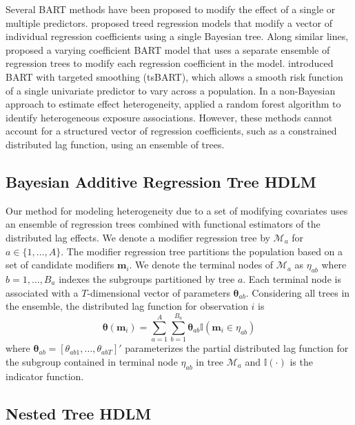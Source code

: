 \documentclass[12pt]{article}
\begin{document}
Several BART methods have been proposed to modify the effect of a single or multiple predictors. \cite{Chipman2002} proposed treed regression models that modify a vector of individual regression coefficients using a single Bayesian tree. Along similar lines, \cite{Deshpande2020VCBART:Coefficients} proposed a varying coefficient BART model that uses a separate ensemble of regression trees to modify each regression coefficient in the model. \cite{Starling2019} introduced BART with targeted smoothing (tsBART), which allows a smooth risk function of a single univariate predictor to vary across a population.  In a non-Bayesian approach to estimate effect heterogeneity, \cite{Odden2020HeterogeneousAdults} applied a random forest algorithm to identify heterogeneous exposure associations. However, these methods cannot account for a structured vector of regression coefficients, such as a constrained distributed lag function, using an ensemble of trees.

\subsection{Bayesian Additive Regression Tree HDLM}\label{sec:bart_hdlm}
Our method for modeling heterogeneity due to a set of modifying covariates uses an ensemble of regression trees combined with functional estimators of the distributed lag effects. We denote a modifier regression tree by $\mathcal{M}_a$ for $a\in\{1,\ldots,A\}$. The modifier regression tree partitions the population based on a set of candidate modifiers $\mathbf{m}_i$. We denote the terminal nodes of $\mathcal{M}_a$ as $\eta_{ab}$ where $b=1,\ldots,B_a$ indexes the subgroups partitioned by tree $a$.  Each terminal node is associated with a $T$-dimensional vector of parameters $\boldsymbol\theta_{ab}$. Considering all trees in the ensemble, the distributed lag function for observation $i$ is
\begin{equation}\label{eq:dlmtree_heterogeneous_dlm}
    \boldsymbol\theta(\mathbf{m}_i)=\sum_{a=1}^A\sum_{b=1}^{B_a}\boldsymbol\theta_{ab}\mathbb{I}(\mathbf{m}_i\in\eta_{ab})
\end{equation}
where $\boldsymbol\theta_{ab}=[\theta_{ab1},\ldots,\theta_{abT}]'$ parameterizes the partial distributed lag function for the subgroup contained in terminal node $\eta_{ab}$ in tree $\mathcal{M}_a$ and $\mathbb{I}(\cdot)$ is the indicator function.




\subsection{Nested Tree HDLM}\label{sec:nested_tree_hdlm}
\end{document}

